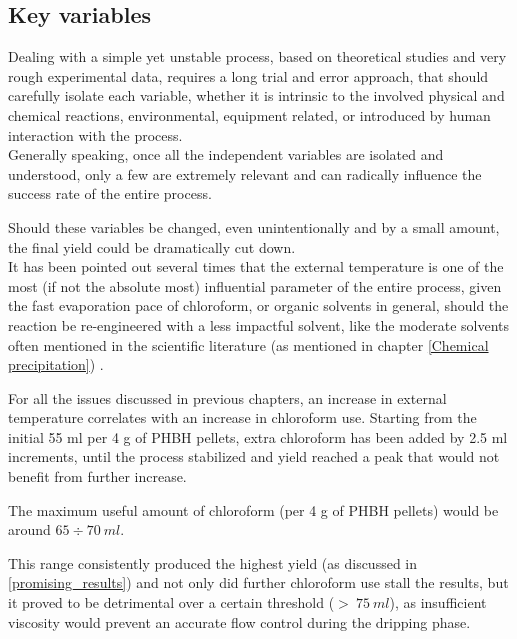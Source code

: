 \documentclass{article}
\begin{document}
        \subsection{Key variables\label{key_variables}}

        Dealing with a simple yet unstable process, based on theoretical studies and very rough experimental data, requires a
        long trial and error approach, that should carefully isolate each variable, whether it is intrinsic to the 
        involved physical and chemical reactions, environmental, equipment related, or introduced by human 
        interaction with the process. \\ 

        Generally speaking, once all the independent variables are isolated and understood, only a few are extremely relevant and can 
        radically influence the success rate of the entire process. 

        Should these variables be changed, even unintentionally and by a small amount, the final yield
        could be dramatically cut down. \\ 

        It has been pointed out several times that the external temperature is one of the most 
        (if not the absolute most) influential parameter of the entire process, given the fast evaporation pace of chloroform, 
        or organic solvents in general, should the reaction be re-engineered with a less impactful solvent, like the moderate 
        solvents often mentioned in the scientific literature (as mentioned in chapter \ref{Chemical precipitation}) \autocites{Padovano_SLS_Review}.  

        For all the issues discussed in previous chapters, an increase in external temperature correlates with an increase in 
        chloroform use. Starting from the initial 55 ml per 4 g of PHBH pellets, extra chloroform has been added 
        by 2.5 ml increments, until the process stabilized and yield reached a peak that would not benefit from further 
        increase. 
 
        The maximum useful amount of chloroform (per 4 g of PHBH pellets) would be around $65 \div 70 \ ml$. 

        This range consistently produced the highest yield (as discussed in \ref{promising_results}) and not only did further chloroform use stall the 
        results, but it proved to be detrimental over a certain threshold ($ > \ 75 \ ml$), as insufficient 
        viscosity would prevent an accurate flow control during the dripping phase. \\ 
\end{document}
